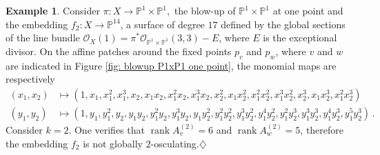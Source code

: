 \documentclass[11pt,reqno]{amsart}
\numberwithin{equation}{section}
\theoremstyle{plain}
\numberwithin{theorem}{section}
\theoremstyle{definition}
\newtheorem{example}[theorem]{Example}
\renewcommand{\P}{\mathbb{P}}
\newcommand{\OO}{\mathcal{O}}
\newcommand{\rank}{\operatorname{rank}}
\begin{document}
\begin{example}\label{ex: blowup P1xP1 one point}
Consider $\pi\colon X\to\P^1\times\P^1,$ the blow-up of $\P^1\times\P^1$ at one point and the embedding $f_2\colon X\to \P^{14}$, a surface of degree $17$ defined by the global sections of the line bundle $\OO_X(1)=\pi^*\OO_{\P^1\times\P^1}(3,3)-E$, where $E$ is the exceptional divisor. On the affine patches around the fixed points $p_v$ and $p_w$, where $v$ and $w$ are indicated in Figure \ref{fig: blowup P1xP1 one point}, the monomial maps are respectively
\begin{align*}
(x_1,x_2) &\mapsto (1,x_1,x_1^2,x_1^3,x_2,x_1x_2,x_1^2x_2,x_1^3x_2,x_2^2,x_1x_2^2,x_1^2x_2^2,x_1^3x_2^2,x_2^3,x_1x_2^3,x_1^2x_2^3)\\
(y_1,y_2) &\mapsto (1,y_1,y_1^2,y_2,y_1y_2,y_1^2y_2,y_1^3y_2,y_1y_2^2,y_1^2y_2^2,y_1^3y_2^2,y_1^4y_2^2,y_1^2y_2^3,y_1^3y_2^3,y_1^4y_2^3,y_1^5y_2^3)\,.
\end{align*}
Consider $k=2$. One verifies that $\rank A_v^{(2)}=6$ and $\rank A_w^{(2)}=5$, therefore the embedding $f_2$ is not globally $2$-osculating.\hfill$\diamondsuit$


\end{example}
\end{document}
